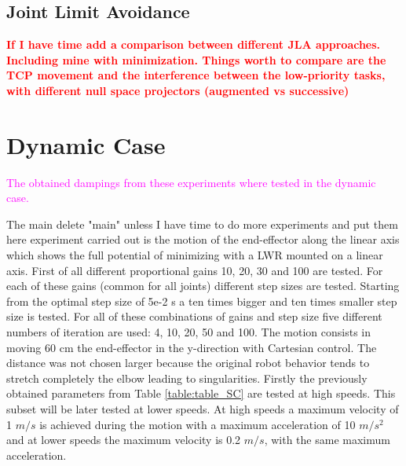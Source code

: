 \subsection{Joint Limit Avoidance}


\textcolor{red}{\textbf{If I have time add a comparison between different JLA approaches. Including mine with minimization. Things worth to compare are the TCP movement and the interference between the low-priority tasks, with different null space projectors (augmented vs successive)}}




\section{Dynamic Case}
\label{sec:dynamic_case}

\textcolor{magenta}{The obtained dampings from these experiments where tested in the dynamic case.}

The  main {\color{red} delete "main" unless I have time to do more experiments and put them here} experiment carried out is the motion of the end-effector along the linear axis which shows the full potential of minimizing with a LWR mounted on a linear axis.
First of all different proportional gains 10, 20, 30 and 100 are tested. For each of these gains (common for all joints) different step sizes are tested. Starting from the optimal step size of 5e-2 s a ten times bigger and ten times smaller step size is tested. For all of these combinations of gains and step size five different numbers of iteration are used: 4, 10, 20, 50 and 100.
The motion consists in moving 60 cm the end-effector in the y-direction with Cartesian control.
The distance was not chosen larger because the original robot behavior tends to stretch completely the elbow leading to singularities. 
 Firstly the previously obtained  parameters from Table 	\ref{table:table_SC} are tested at high speeds. This subset will be later tested at lower speeds. At high speeds a maximum velocity of 1 $m/s$ is achieved during the motion with a maximum acceleration of 10 $m/s^{2}$ and at lower speeds the maximum velocity is 0.2 $m/s$, with the same maximum acceleration.





